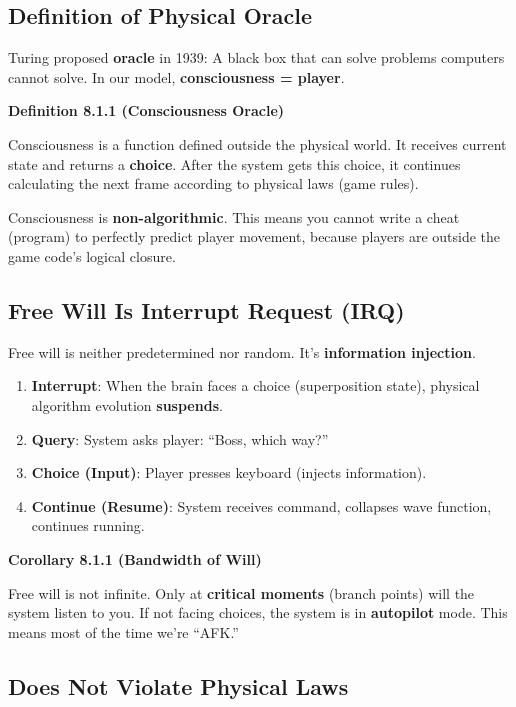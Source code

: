 \subsection{Definition of Physical Oracle}

Turing proposed \textbf{oracle} in 1939: A black box that can solve problems computers cannot solve.
In our model, \textbf{consciousness = player}.

\textbf{Definition 8.1.1 (Consciousness Oracle)}

Consciousness is a function defined outside the physical world. It receives current state and returns a \textbf{choice}.
After the system gets this choice, it continues calculating the next frame according to physical laws (game rules).

Consciousness is \textbf{non-algorithmic}. This means you cannot write a cheat (program) to perfectly predict player movement, because players are outside the game code's logical closure.

\subsection{Free Will Is Interrupt Request (IRQ)}

Free will is neither predetermined nor random. It's \textbf{information injection}.

\begin{enumerate}
\item \textbf{Interrupt}: When the brain faces a choice (superposition state), physical algorithm evolution \textbf{suspends}.
\item \textbf{Query}: System asks player: ``Boss, which way?''
\item \textbf{Choice (Input)}: Player presses keyboard (injects information).
\item \textbf{Continue (Resume)}: System receives command, collapses wave function, continues running.
\end{enumerate}

\textbf{Corollary 8.1.1 (Bandwidth of Will)}

Free will is not infinite. Only at \textbf{critical moments} (branch points) will the system listen to you.
If not facing choices, the system is in \textbf{autopilot} mode. This means most of the time we're ``AFK.''

\subsection{Does Not Violate Physical Laws}

